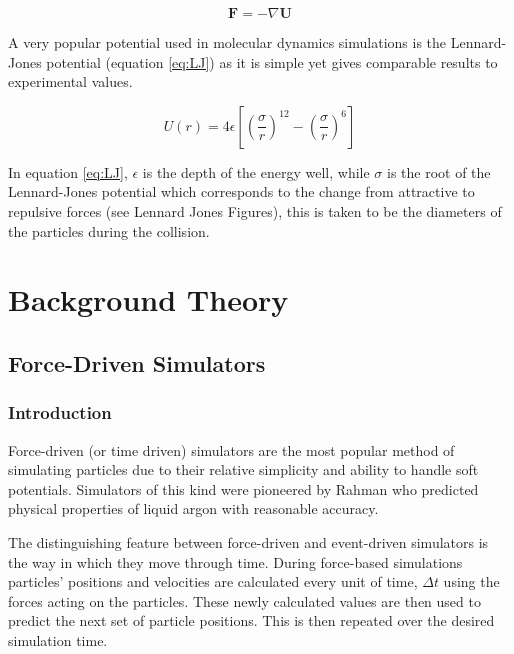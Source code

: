 \documentclass[12pt]{UoAthesis}
\begin{document}
\begin{equation}
  \mathbf{F}=-\nabla \mathbf{U} \label{eq:forcePotential}
\end{equation}

A very popular potential used in molecular dynamics simulations is the
Lennard-Jones potential \cite{Lennard-Jones1924} (equation
\ref{eq:LJ}) as it is simple yet gives comparable results to
experimental values.

\begin{equation}
  U(r) = 4 \epsilon \left[ \left( \frac{\sigma}{r} \right)^{12} - \left( \frac{\sigma}{r} \right)^{6} \right] \label{eq:LJ}
\end{equation}

In equation \ref{eq:LJ}, $\epsilon$ is the depth of the energy well,
while $\sigma$ is the root of the Lennard-Jones potential which
corresponds to the change from attractive to repulsive forces (see
Lennard Jones Figures), this is taken to be the diameters of the
particles during the collision.


\chapter{Background Theory}
\section{Force-Driven Simulators}
\subsection{Introduction}
Force-driven (or time driven) simulators are the most popular method
of simulating particles due to their relative simplicity and ability
to handle soft potentials.  Simulators of this kind were pioneered by
Rahman \cite{Rahman1964} who predicted physical properties of liquid
argon with reasonable accuracy.

The distinguishing feature between force-driven and event-driven
simulators is the way in which they move through time.  During
force-based simulations particles' positions and velocities are
calculated every unit of time, $\Delta t$ using the forces acting on
the particles.  These newly calculated values are then used to predict
the next set of particle positions.  This is then repeated over the
desired simulation time.
\end{document}
